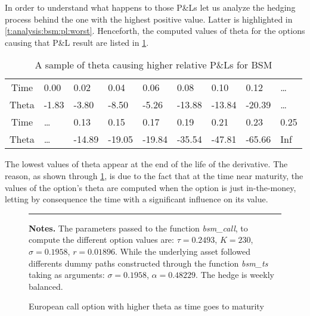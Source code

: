 \documentclass[12pt]{report}
\begin{document}
In order to understand what happens to those P\&Ls let us analyze the hedging process behind the one with the highest positive value. Latter is highlighted in \cref{t:analysis:bsm:pl:worst}.
Henceforth, the computed values of theta for the options causing that P\&L result are listed in \cref{t:analysis:bsm:pl:worst:theta}.

 
\begin{table}[h]
\centering
\begin{tabular}{c|llllllll}
  \hline
  \hline
  Time & 0.00 & 0.02 & 0.04 & 0.06 & 0.08 & 0.10 & 0.12 & \ldots\\ 
Theta & -1.83 & -3.80 & -8.50 & -5.26 & -13.88 & -13.84 & -20.39 & \ldots \\ 
   \hdashline
  Time & \ldots & 0.13 & 0.15 & 0.17 & 0.19 & 0.21 & 0.23 & 0.25 \\ 
  Theta & \ldots & -14.89 & -19.05 & -19.84 & -35.54 & -47.81 & -65.66 & Inf \\ 
   \hline
\end{tabular}
\caption{A sample of theta causing higher relative P\&Ls for BSM} 
\label{t:analysis:bsm:pl:worst:theta}
\end{table}



The lowest values of theta appear at the end of the life of the derivative. 
The reason, as shown through \cref{p:analysis:gbm:pl:theta:high},  is due to the fact that at the time near maturity, the values of the option's theta are computed when the option is just in-the-money, letting by consequence the time with a significant influence on its value.


\begin{figure}[h]
  \centering
  \rule{40mm}{20mm}
  \caption{European call option with higher theta as time goes to maturity}
  \begin{changemargin}{0.5cm}{0.5cm}
  \medskip
\footnotesize
{}\textbf{Notes.} The parameters passed to the function \textit{bsm\_call}, to compute the different option values are: $\tau = 0.2493$, $K = 230$, $\sigma = 0.1958$, $r = 0.01896$. While the underlying asset followed differents dummy paths constructed through the function \textit{bsm\_ts} taking as arguments: $\sigma = 0.1958$, $\alpha = 0.48229$. The hedge is weekly balanced.
  \end{changemargin}
  \label{p:analysis:gbm:pl:theta:high}
\end{figure}
\end{document}
